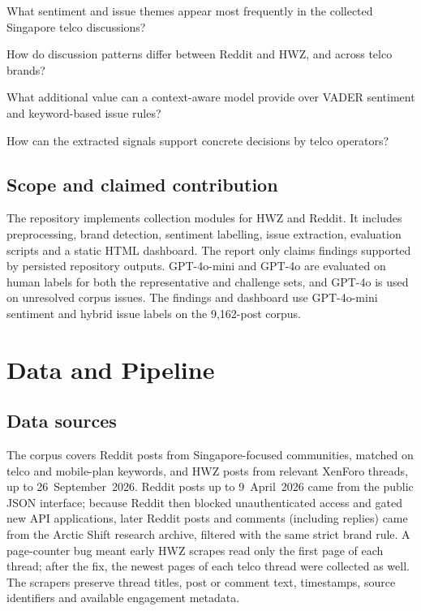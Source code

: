 \documentclass[11pt,a4paper]{article}
\begin{document}
\begin{description}[leftmargin=0cm,style=nextline]
  \item[RQ1.] What sentiment and issue themes appear most frequently in the collected Singapore telco discussions?
  \item[RQ2.] How do discussion patterns differ between Reddit and HWZ, and across telco brands?
  \item[RQ3.] What additional value can a context-aware model provide over VADER sentiment and keyword-based issue rules?
  \item[RQ4.] How can the extracted signals support concrete decisions by telco operators?
\end{description}

\subsection{Scope and claimed contribution}

The repository implements collection modules for HWZ and Reddit. It includes preprocessing, brand detection, sentiment labelling, issue extraction, evaluation scripts and a static HTML dashboard. The report only claims findings supported by persisted repository outputs. GPT-4o-mini and GPT-4o are evaluated on human labels for both the representative and challenge sets, and GPT-4o is used on unresolved corpus issues. The findings and dashboard use GPT-4o-mini sentiment and hybrid issue labels on the 9,162-post corpus.

\section{Data and Pipeline}

\subsection{Data sources}

The corpus covers Reddit posts from Singapore-focused communities, matched on telco and mobile-plan keywords, and HWZ posts from relevant XenForo threads, up to 26~September~2026. Reddit posts up to 9~April~2026 came from the public JSON interface; because Reddit then blocked unauthenticated access and gated new API applications, later Reddit posts and comments (including replies) came from the Arctic Shift research archive, filtered with the same strict brand rule. A page-counter bug meant early HWZ scrapes read only the first page of each thread; after the fix, the newest pages of each telco thread were collected as well. The scrapers preserve thread titles, post or comment text, timestamps, source identifiers and available engagement metadata.
\end{document}
